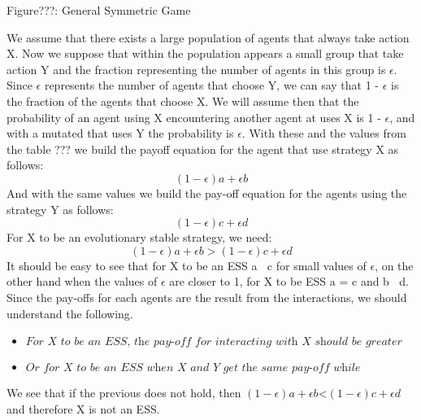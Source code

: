 \documentclass{article}
\begin{document}
\begin{center}
	Figure???: General Symmetric Game
\end{center}
We assume that there exists a large population of agents that always take action X. Now we suppose that within the population appears a small group that take action Y and the   fraction representing the number of agents in this group is $\epsilon$.  Since $\epsilon$ represents the number of agents that choose Y, we can say that 1 - $\epsilon$ is the fraction of the agents that choose X.  We will assume then that the probability of an agent using X encountering another agent at uses X is 1 - $\epsilon$, and with a mutated that uses Y the probability is $\epsilon$.  With these and the values from the table ??? we build the payoff equation for the agent that use strategy X as follows:
\begin{equation}
(1-{\epsilon})a + {\epsilon}b
\end{equation}
And with the same values we build the pay-off equation for the agents using the strategy Y as follows:
\begin{equation}
(1-{\epsilon})c + {\epsilon}d
\end{equation}
For X to be an evolutionary stable strategy, we need:
\begin{equation}
(1-{\epsilon})a + {\epsilon}b > (1-{\epsilon})c + {\epsilon}d
\end{equation}
It should be easy to see that for X to be an ESS a $\>$ c for small values of $\epsilon$, on the other hand when the values of $\epsilon$ are closer to 1, for X to be ESS a = c and b $\>$ d.
Since the pay-offs for each agents are the result from the interactions, we should understand the following.
\begin{itemize}
\item $\textit{For X to be an ESS, the pay-off for interacting with X should be greater or at least equal to the pay-off that an Y gets when interacting with X.}$
\item $\textit{Or for X to be an ESS when X and Y get the same pay-off while interacting with X, X needs to get a better pay-off when interacting with Y than Y interacting with Y.}$
\end{itemize}
We see that if the previous does not hold, then $(1-{\epsilon})a + {\epsilon}b $<$ (1-{\epsilon})c + {\epsilon}d$ and therefore X is not an ESS.
\end{document}
